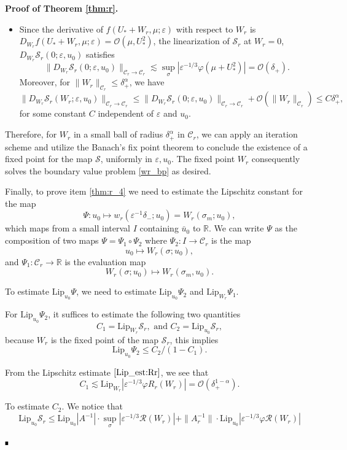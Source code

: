 \documentclass[letterpaper,11pt]{article}
\newcommand{\rmO}{\mathcal{O}}
\newcommand{\eps}{\varepsilon}
\newcommand{\lar}{ \lesssim }
\numberwithin{equation}{section}
\theoremstyle{plain}
\newenvironment{Proof}[1][.]%
 {\begin{trivlist}\item[]\textbf{Proof#1 }}%
 {\hspace*{\fill}$\rule{0.3\baselineskip}{0.35\baselineskip}$\end{trivlist}}
\begin{document}
\begin{Proof}[ of Theorem \ref{thm:r}.]
\begin{itemize}
\item Since the derivative of $f(U_*+W_r,\mu;\eps)$ with respect to $W_r$ is $D_{W_r} f(U_*+W_r,\mu;\eps)=\rmO(\mu, U_*^2)$, the linearization of $\mathcal{S}_r$ at $W_r=0$, $D_{W_r} \mathcal{S}_r(0;\eps,u_0)$ satisfies
\[
\|D_{W_r} \mathcal{S}_r(0;\eps,u_0)\|_{\mathcal{C}_r \to \mathcal{C}_r} \lar \sup_{\sigma}|\eps^{-1/3}\varphi(\mu+U_*^2)| = \rmO(\delta_+).
\]
Moreover, for $\|W_r\|_{\mathcal{C}_r} \le \delta_+^{\alpha}$, we have 
\[
\|D_{W_r}\mathcal{S}_r(W_r;\eps,u_0)\|_{\mathcal{C}_r \to \mathcal{C}_r} \le  \|D_{W_r}\mathcal{S}_r(0;\eps,u_0)\|_{\mathcal{C}_r \to \mathcal{C}_r}+\rmO(\|W_r\|_{\mathcal{C}_r}) \le C\delta_+^\alpha,
\] 
for some constant $C$ independent of $\eps$ and $u_0$.
\end{itemize}

Therefore, for $W_r$ in a small ball of radius $\delta_+^{\alpha}$ in $\mathcal{C}_r$, we can apply an iteration scheme and utilize the Banach's fix point theorem to conclude the existence of a fixed point for the map $\mathcal{S}$, uniformly in $\eps, u_0$. The fixed point $W_r$ consequently solves the boundary value problem \eqref{wr_bp} as desired.


Finally, to prove item \ref{thm:r_4} we need to estimate the Lipschitz constant for the map 
\[
\Psi : u_0 \mapsto w_r(\eps^{-1}\delta_-; u_0)=W_r(\sigma_m;u_0),
\]
 which maps from a small interval $I$ containing $\bar{u}_0$ to $\mathbb{R}$. We can write $\Psi$ as the composition of two maps $\Psi = \Psi_1 \circ \Psi_2$ where $\Psi_2 : I \to \mathcal{C}_r$ is the map 
\[
 u_0 \mapsto W_r(\sigma; u_0),
\] 
and $\Psi_1 : \mathcal{C}_r \to \mathbb{R}$ is the evaluation map
\[
  W_r(\sigma; u_0) \mapsto W_r(\sigma_m, u_0).
\]
 
To estimate $\text{Lip}_{u_0} \Psi$, we need to estimate $\text{Lip}_{u_0} \Psi_2$ and $\text{Lip}_{W_r} \Psi_1$.

For $\text{Lip}_{u_0} \Psi_2$, it suffices to estimate the following two quantities
\[
C_1 = \text{Lip}_{W_r} \mathcal{S}_r, \text{ and }C_2 = \text{Lip}_{u_0} \mathcal{S}_r,
\]
because $W_r$ is the fixed point of the map $\mathcal{S}_r$, this implies
\[
\text{Lip}_{u_0} \Psi_2 \le  C_2/(1-C_1).
\]

From the Lipschitz estimate $\eqref{Lip_est:Rr}$, we see that
\[
C_1 \lar \text{Lip}_{W_r} |\eps^{-1/3}\varphi R_r(W_r)| = \rmO(\delta_+^{1-\alpha}).
\]

To estimate $C_2$. We notice that 
\[
\text{Lip}_{u_0} \mathcal{S}_r \le \text{Lip}_{u_0} |A^{-1}| \cdot \sup_{\sigma}|\eps^{-1/3}\mathcal{R}(W_r)|+ \|A_r^{-1}\| \cdot \text{Lip}_{u_0} |\eps^{-1/3}\varphi\mathcal{R}(W_r)|
\]


\end{Proof}
\end{document}
